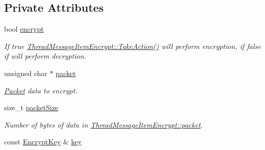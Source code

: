 \subsection*{Private Attributes}
\begin{DoxyCompactItemize}
\item 
\hypertarget{class_thread_message_item_encrypt_ae46648288267f23d50fe2507f5bf4718}{
bool \hyperlink{class_thread_message_item_encrypt_ae46648288267f23d50fe2507f5bf4718}{encrypt}}
\label{class_thread_message_item_encrypt_ae46648288267f23d50fe2507f5bf4718}

\begin{DoxyCompactList}\small\item\em If true \hyperlink{class_thread_message_item_encrypt_aaffd6c727e69eadac8efb947337e358d}{ThreadMessageItemEncrypt::TakeAction()} will perform encryption, if false if will perform decryption. \item\end{DoxyCompactList}\item 
\hypertarget{class_thread_message_item_encrypt_a7982d9c0673a2a733c5ce3fc5851bbda}{
unsigned char $\ast$ \hyperlink{class_thread_message_item_encrypt_a7982d9c0673a2a733c5ce3fc5851bbda}{packet}}
\label{class_thread_message_item_encrypt_a7982d9c0673a2a733c5ce3fc5851bbda}

\begin{DoxyCompactList}\small\item\em \hyperlink{class_packet}{Packet} data to encrypt. \item\end{DoxyCompactList}\item 
\hypertarget{class_thread_message_item_encrypt_a4b01e980e0151bf7eb85fe5c9358a0a1}{
size\_\-t \hyperlink{class_thread_message_item_encrypt_a4b01e980e0151bf7eb85fe5c9358a0a1}{packetSize}}
\label{class_thread_message_item_encrypt_a4b01e980e0151bf7eb85fe5c9358a0a1}

\begin{DoxyCompactList}\small\item\em Number of bytes of data in \hyperlink{class_thread_message_item_encrypt_a7982d9c0673a2a733c5ce3fc5851bbda}{ThreadMessageItemEncrypt::packet}. \item\end{DoxyCompactList}\item 
\hypertarget{class_thread_message_item_encrypt_a88374511c45fddc43e4d200df35b7ac4}{
const \hyperlink{class_encrypt_key}{EncryptKey} \& \hyperlink{class_thread_message_item_encrypt_a88374511c45fddc43e4d200df35b7ac4}{key}}
\label{class_thread_message_item_encrypt_a88374511c45fddc43e4d200df35b7ac4}


\end{DoxyCompactItemize}
